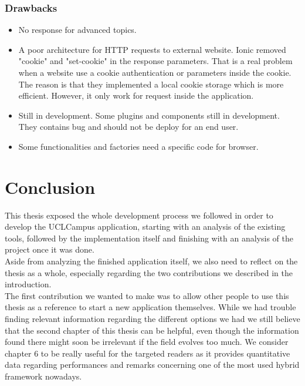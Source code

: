 \documentclass{eplmastersthesis}
\begin{document}
\subsection{Drawbacks}
\begin{itemize}
\item No response for advanced topics. 
\item A poor architecture for HTTP requests to external website. Ionic removed "cookie" and "set-cookie" in the response parameters. That is a real problem when a website use a cookie authentication or parameters inside the cookie. The reason is that they implemented a local cookie storage which is more efficient. However, it only work for request inside the application.
\item Still in development. Some plugins and components still in development. They contains bug and should not be deploy for an end user. 
\item Some functionalities and factories need a specific code for browser. 
\end{itemize}

\chapter{Conclusion} 

This thesis exposed the whole development process we followed in order to develop the UCLCampus application, starting with an analysis of the existing tools, followed by the implementation itself and finishing with an analysis of the project once it was done.\\

Aside from analyzing the finished application itself, we also need to reflect on the thesis as a whole, especially regarding the two contributions we described in the introduction.\\

The first contribution we wanted to make was to allow other people to use this thesis as a reference to start a new application themselves. While we had trouble finding relevant information regarding the different options we had we still believe that the second chapter of this thesis can be helpful, even though the information found there might soon be irrelevant if the field evolves too much.
We consider chapter 6 to be really useful for the targeted readers as it provides quantitative data regarding performances and remarks concerning one of the most used hybrid framework nowadays.\\
\end{document}
